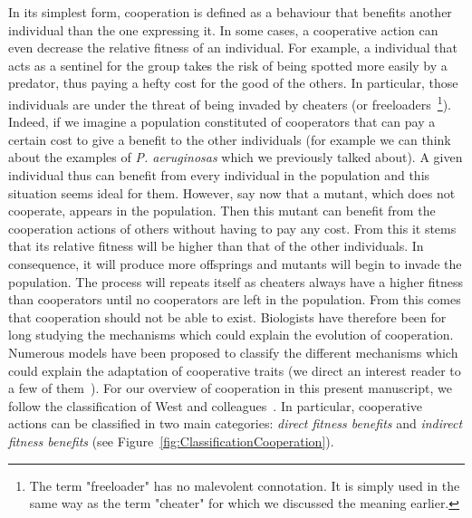     In its simplest form, cooperation is defined as a behaviour that benefits another individual than the one expressing it. In some cases, a cooperative action can even decrease the relative fitness of an individual. For example, a individual that acts as a sentinel for the group takes the risk of being spotted more easily by a predator, thus paying a hefty cost for the good of the others. In particular, those individuals are under the threat of being invaded by cheaters (or freeloaders~\footnote{The term "freeloader" has no malevolent connotation. It is simply used in the same way as the term "cheater" for which we discussed the meaning earlier.}). Indeed, if we imagine a population constituted of cooperators that can pay a certain cost to give a benefit to the other individuals (for example we can think about the examples of \emph{P. aeruginosas} which we previously talked about). A given individual thus can benefit from every individual in the population and this situation seems ideal for them. However, say now that a mutant, which does not cooperate, appears in the population. Then this mutant can benefit from the cooperation actions of others without having to pay any cost. From this it stems that its relative fitness will be higher than that of the other individuals. In consequence, it will produce more offsprings and mutants will begin to invade the population. The process will repeats itself as cheaters always have a higher fitness than cooperators until no cooperators are left in the population. From this comes that cooperation should not be able to exist. Biologists have therefore been for long studying the mechanisms which could explain the evolution of cooperation. Numerous models have been proposed to classify the different mechanisms which could explain the adaptation of cooperative traits (we direct an interest reader to a few of them~\parencite{Dugatkin2002, Keller2006, Bergmuller2007a, West2007}). For our overview of cooperation in this present manuscript, we follow the classification of West and colleagues~\parencite{West2007a}. In particular, cooperative actions can be classified in two main categories: \emph{direct fitness benefits} and \emph{indirect fitness benefits} (see Figure~\ref{fig:ClassificationCooperation}).

